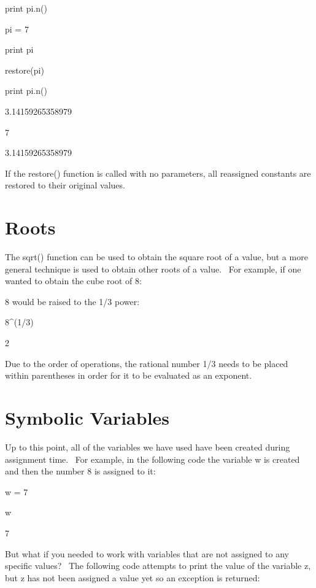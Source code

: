 \documentclass[12pt,twoside]{book}
\begin{document}
\bigskip

print pi.n()


\bigskip

pi = 7

print pi


\bigskip

restore({\textquotesingle}pi{\textquotesingle})

print pi.n()

{\textbar}

3.14159265358979

7

3.14159265358979

If the restore() function is called with no parameters, all reassigned constants are restored to their original values.

\section[Roots]{Roots}

The sqrt() function can be used to obtain the square root of a value, but a more general technique is used to obtain other roots of a value. \ For example, if one wanted to obtain the cube root of 8: 

\bigskip

8 would be raised to the 1/3 power:

8\^{}(1/3)

{\textbar}

2


\bigskip

Due to the order of operations, the rational number 1/3 needs to be placed within parentheses in order for it to be evaluated as an exponent.

\section[Symbolic Variables]{Symbolic Variables}

Up to this point, all of the variables we have used have been created during assignment time. \ For example, in the following code the variable w is created and then the number 8 is assigned to it: 

\bigskip

w = 7

w

{\textbar}

7



But what if you needed to work with variables that are not assigned to any specific values? \ The following code attempts to print the value of the variable z, but z has not been assigned a value yet so an exception is returned: 
\end{document}
